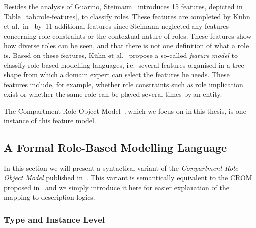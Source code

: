 Besides the analysis of Guarino, Steimann~\cite{Stei-DKE00} introduces 15 features, depicted in
Table~\ref{tab:role-features}, to classify roles. These features are completed by Kühn et al.\
in~\cite{KuLG-SLE14} by~11 additional features since Steimann neglected any features concerning role
constraints or the contextual nature of roles.  These features show how diverse roles can be seen,
and that there is not one definition of what a role is. Based on these features, Kühn et
al.~\cite{KuLG-SLE14} propose a so-called \emph{feature model} to classify role-based modelling
languages, i.e.\ several features organised in a tree shape from which a domain expert can select
the features he needs. These features include, for example, whether role constraints such as role
implication exist or whether the same role can be played several times by an entity.

The Compartment Role Object Model~\cite{KBG-SLE15}, which we focus on in this thesis, is one
instance of this feature model.


\subsection{A Formal Role-Based Modelling Language}
\label{sec:sigma-crom}

In this section we will present a syntactical variant of the \emph{Compartment Role Object Model}
published in~\cite{KBG-SLE15}. This variant is semantically equivalent to the CROM proposed
in~\cite{KBG-SLE15} and we simply introduce it here for easier explanation of the mapping to
description logics.

\subsubsection{Type and Instance Level}
\label{sec:type-instance-level}

